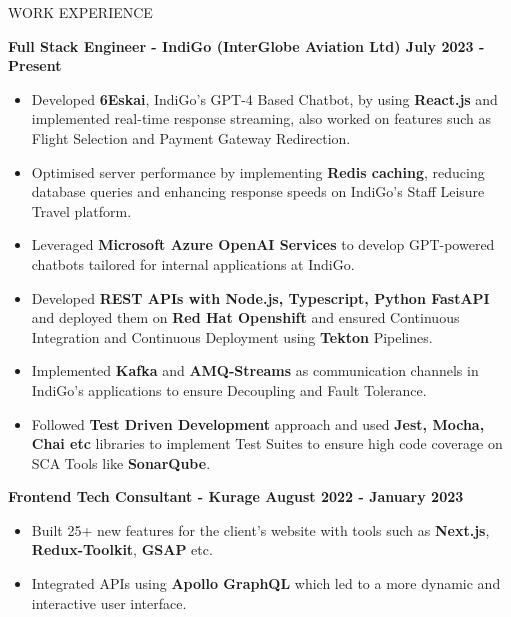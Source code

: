 \documentclass{resume} %
\begin{document}







\begin{rSection}{WORK EXPERIENCE}

{\bf Full Stack Engineer - IndiGo (InterGlobe Aviation Ltd)  \hfill July 2023 - Present }
\begin{itemize}
    \item {\normalfont Developed \textbf{6Eskai}, IndiGo's GPT-4 Based Chatbot, by using \textbf{React.js} and implemented real-time response streaming, also worked on features such as Flight Selection and Payment Gateway Redirection.}
    
    \item {\normalfont Optimised server performance by implementing \textbf{Redis caching}, reducing database queries and enhancing response speeds on IndiGo’s Staff Leisure Travel platform.}
    \item {\normalfont Leveraged \textbf{Microsoft Azure OpenAI Services} to develop GPT-powered chatbots tailored for internal applications at IndiGo.}
    \item {\normalfont Developed \textbf{REST APIs with Node.js, Typescript, Python FastAPI} and deployed them on \textbf{Red Hat Openshift} and ensured Continuous Integration and Continuous Deployment using \textbf{Tekton} Pipelines.}
    \item {\normalfont Implemented \textbf{Kafka} and \textbf{AMQ-Streams} as communication channels in IndiGo's applications to ensure Decoupling and Fault Tolerance.}
    \item {\normalfont Followed \textbf{Test Driven Development} approach and used \textbf{Jest, Mocha, Chai etc} libraries to implement Test Suites to ensure high code coverage on SCA Tools like \textbf{SonarQube}.}
\end{itemize}


{\bf Frontend Tech Consultant - Kurage  \hfill August 2022 - January 2023 }
\begin{itemize}

    \item {\normalfont  Built 25+ new features for the client's website with tools such as \textbf{{Next.js}}, \textbf{{Redux-Toolkit}}, \textbf{{GSAP}} etc. }
   \item {\normalfont Integrated APIs using \textbf{{Apollo GraphQL}} which led to a more dynamic and interactive user interface.} 
 
\end{itemize}

\end{rSection}
\end{document}

